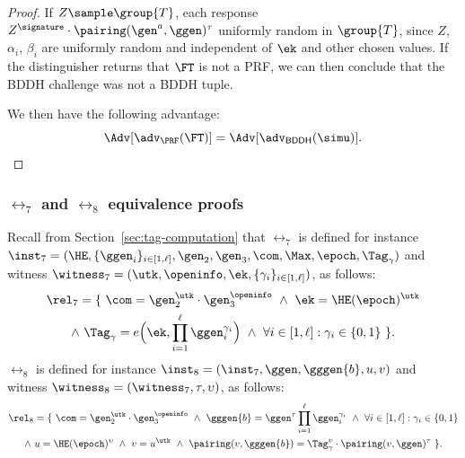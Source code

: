 \begin{proof}
  If $Z \sample \group{T}$, each response $Z^{\signature} \cdot
  \pairing(\gen^a, \ggen)^{\tau}$ uniformly random in $\group{T}$, since $Z$,
  $\alpha_i$, $\beta_i$ are uniformly random and independent of $\ek$ and other
  chosen values.  If the distinguisher returns that $\FT$ is not a PRF, we can
  then conclude that the BDDH challenge was not a BDDH tuple.

  We then have the following advantage:
%
  \begin{equation*}
%
    \Adv[\adv_{\PRF}(\FT)] = \Adv[\adv_\mathsf{BDDH}(\simu)].
%
  \end{equation*}
%
\end{proof}

\subsubsection*{$\rel_7$ and $\rel_8$ equivalence proofs}

Recall from Section~\ref{sec:tag-computation} that $\rel_7$ is defined for
instance $\inst_7 = (\HE, \{\ggen_i\}_{i\in[1,\ell]}, \gen_2, \gen_3, \com,
\Max, \epoch, \Tag_\gamma)$ and witness $\witness_7 = (\utk, \openinfo, \ek,
\{\gamma_i\}_{i\in[1,\ell]})$, as follows:
%
\begin{equation}\label{eq:rel7-concrete-recall} \begin{gathered}
%
  \rel_7 = \{\ \com = \gen_2^{\utk}\cdot \gen_3^{\openinfo} \ \wedge \ \ek =
  \HE(\epoch)^{\utk} \\ \wedge \ \Tag_{\gamma} = e\Big(\ek,\prod_{i=1}^{\ell}
\ggen_i^{\gamma_i} \Big) \ \wedge \ \forall i \in[1, \ell]: \gamma_i \in
\{0,1\}\ \}.
%
\end{gathered} \end{equation}
%
$\rel_8$ is defined for instance $\inst_8 = (\inst_7, \ggen, \gggen{b}, u, v)$
and witness $\witness_8 = (\witness_7, \tau, \upsilon)$, as follows:
%
\begin{equation}\label{eq:rel7-hat-recall} \begin{gathered}
%
  \rel_8 = \{\ \com = \gen_2^{\utk}\cdot \gen_3^{\openinfo} \ \wedge \
    \gggen{b} = \ggen^\tau\prod_{i=1}^{\ell} \ggen_i^{\gamma_i} \ \wedge \
    \forall i \in [1,\ell]: \gamma_i \in \{0,1\} \\ \wedge \ u =
    \HE(\epoch)^\upsilon \ \wedge \ v = u^{\utk} \ \wedge \ \pairing(v,
  \gggen{b}) = \Tag_\gamma^\upsilon \cdot \pairing(v, \ggen)^\tau\ \}.
%
\end{gathered} \end{equation}
%

